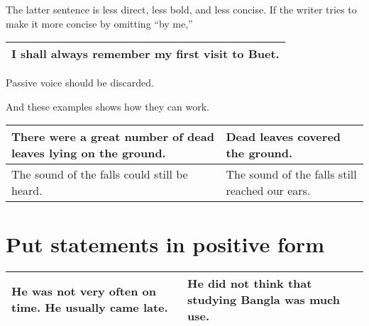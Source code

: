 \documentclass[10pt]{report}
\begin{document}
 The latter sentence is less direct, less bold, and less concise. If the writer tries to make
it more concise by omitting “by me,”
 
\begin{table}[!tbh]
    \centering
        \begin{tabular}{|l|}
        \hline
       I shall always remember my first visit to Buet.\\
       \hline


       
        

 \end{tabular}
 \end{table} 
 
 
 
 Passive voice should be discarded.



 
 
And these examples shows how they can work.


\begin{table}[!tbh]
    \centering
        \begin{tabular}{|m{18em}|m{18em}|}
        \hline
      There were a great number
of dead leaves lying
on the ground.&
Dead leaves covered
the ground.\\ \hline
The sound of the falls could
still be heard.&
The sound of the falls still
reached our ears.\\
\hline

       
       


       
        

 \end{tabular}
 \end{table}
 
 
 \section {\bfseries Put statements in positive form}

 	\begin{table}[!tbh]
    \centering
        \begin{tabular}{|m{18em}|m{18em}|}
        \hline
 He was not very often on time. He usually came late.&
He did not think that studying
Bangla was much use.\\
\hline
    

 \end{tabular}
 \end{table}
 
\end{document}
